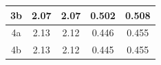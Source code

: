 \begin{table}[ht]
\begin{tabular}{|c|c|c||c|c|}
    3b                            & 2.07                    & 2.07                                   & 0.502                    & 0.508 \\ \hline
    4a                            & 2.13                    & 2.12                                   & 0.446                    & 0.455 \\
    4b                            & 2.13                    & 2.12                                   & 0.445                    & 0.455 \\ \hline
    \end{tabular}
    \label{tab:MoS2_Wannier_exciton_spectrum}
\end{table}

